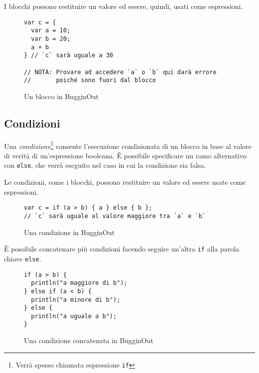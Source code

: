 I blocchi possono restituire un valore ed essere, quindi, usati come espressioni.

\begin{figure}[H]
	\centering
	\begin{verbatim}
var c = {
  var a = 10;
  var b = 20;
  a + b
} // `c` sarà uguale a 30

// NOTA: Provare ad accedere `a` o `b` qui darà errore
//       poiché sono fuori dal blocco
	\end{verbatim}
	\caption{Un blocco in BugginOut}
	\label{fig:block-example}
\end{figure}

\subsection{Condizioni}

Una \emph{condizione}\footnote{Verr\`a spesso chiamata espressione \texttt{if}} consente l'esecuzione condizionata di un blocco in base al valore di verit\`a di un'espressione booleana. \`E possibile specificare un ramo alternativo con \texttt{else}, che verr\`a eseguito nel caso in cui la condizione sia falsa.

Le condizioni, come i blocchi, possono restituire un valore ed essere usate come espressioni.

\begin{figure}[H]
	\centering
	\begin{verbatim}
var c = if (a > b) { a } else { b };
// `c` sarà uguale al valore maggiore tra `a` e `b`
	\end{verbatim}
	\caption{Una condizione in BugginOut}
	\label{fig:condition-example}
\end{figure}

\`E possibile concatenare pi\`u condizioni facendo seguire un'altra \texttt{if} alla parola chiave \texttt{else}.

\begin{figure}[H]
	\centering
	\begin{verbatim}
if (a > b) {
  println("a maggiore di b");
} else if (a < b) {
  println("a minore di b");
} else {
  println("a uguale a b");
}
	\end{verbatim}
	\caption{Una condizione concatenata in BugginOut}
	\label{fig:chained-condition-example}
\end{figure}

